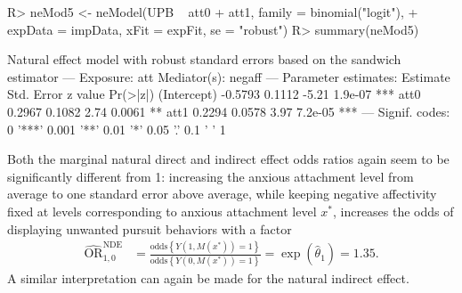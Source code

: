 \documentclass[nojss]{jss}
\begin{document}
\begin{Schunk}
\begin{Sinput}
R> neMod5 <- neModel(UPB ~ att0 + att1, family = binomial("logit"),
+    expData = impData, xFit = expFit, se = "robust")
R> summary(neMod5)
\end{Sinput}
\begin{Soutput}
Natural effect model
with robust standard errors based on the sandwich estimator
---
Exposure: att 
Mediator(s): negaff 
---
Parameter estimates:
            Estimate Std. Error z value Pr(>|z|)    
(Intercept)  -0.5793     0.1112   -5.21  1.9e-07 ***
att0          0.2967     0.1082    2.74   0.0061 ** 
att1          0.2294     0.0578    3.97  7.2e-05 ***
---
Signif. codes:  0 '***' 0.001 '**' 0.01 '*' 0.05 '.' 0.1 ' ' 1
\end{Soutput}
\end{Schunk}

\par Both the marginal natural direct and indirect effect odds ratios again seem to be significantly different from 1: increasing the anxious attachment level from average to one standard error above average, while keeping negative affectivity fixed at levels corresponding to anxious attachment level $x^*$, increases the odds of displaying unwanted pursuit behaviors with a factor
\begin{align*}
\widehat{\mbox{OR}}^{\text{NDE}}_{1,0} &= \frac{\mbox{odds}\left\{Y(1,M(x^*))=1\right\}}{\mbox{odds}\left\{Y(0,M(x^*))=1\right\}} = \exp(\hat{\theta}_1) = 1.35.
\end{align*}
A similar interpretation can again be made for the natural indirect effect.
\end{document}
